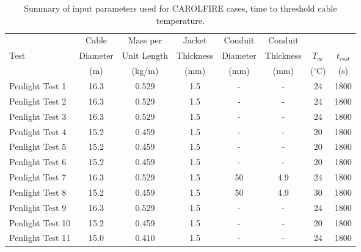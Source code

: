 \begin{table}[!ht]
\caption[Input parameters for CAROLFIRE cases, time to threshold cable temperature.]
{Summary of input parameters used for CAROLFIRE cases, time to threshold cable temperature.}

\begin{center}
\begin{tabular}{|l|c|c|c|c|c|c|c|}
\hline
                  &  Cable     &  Mass per     &  Jacket     &  Conduit   &  Conduit    &               &             \\
Test              &  Diameter  &  Unit Length  &  Thickness  &  Diameter  &  Thickness  &  $T_\infty$   &  $t_{end}$  \\
                  &  (m)       &  (kg/m)       &  (mm)       &  (mm)      &  (mm)       &  ($^\circ$C)  &  (s)        \\ \hline \hline
Penlight Test 1   &  16.3      &  0.529        &  1.5        &  -         &  -          &  24           &  1800       \\ \hline
Penlight Test 2   &  16.3      &  0.529        &  1.5        &  -         &  -          &  24           &  1800       \\ \hline
Penlight Test 3   &  16.3      &  0.529        &  1.5        &  -         &  -          &  24           &  1800       \\ \hline
Penlight Test 4   &  15.2      &  0.459        &  1.5        &  -         &  -          &  20           &  1800       \\ \hline
Penlight Test 5   &  15.2      &  0.459        &  1.5        &  -         &  -          &  20           &  1800       \\ \hline
Penlight Test 6   &  15.2      &  0.459        &  1.5        &  -         &  -          &  20           &  1800       \\ \hline
Penlight Test 7   &  16.3      &  0.529        &  1.5        &  50        &  4.9        &  24           &  1800       \\ \hline
Penlight Test 8   &  15.2      &  0.459        &  1.5        &  50        &  4.9        &  30           &  1800       \\ \hline
Penlight Test 9   &  16.3      &  0.529        &  1.5        &  -         &  -          &  24           &  1800       \\ \hline
Penlight Test 10  &  15.2      &  0.459        &  1.5        &  -         &  -          &  20           &  1800       \\ \hline
Penlight Test 11  &  15.0      &  0.410        &  1.5        &  -         &  -          &  24           &  1800       \\ \hline

\end{tabular}
\end{center}
\end{table}
